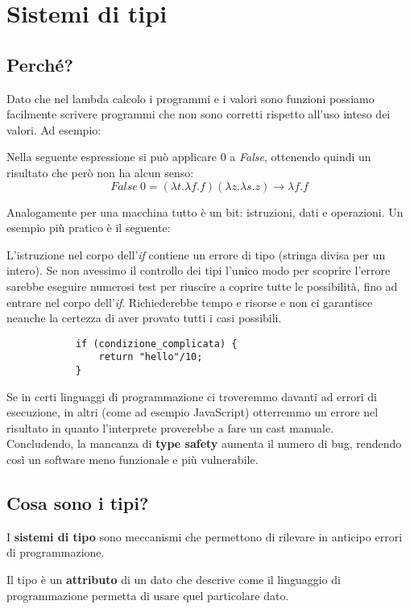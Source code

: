 \newpage
\section{Sistemi di tipi}
\subsection{Perché?}
Dato che nel lambda calcolo i programmi e i valori sono funzioni
possiamo facilmente scrivere programmi che non sono corretti rispetto
all’uso inteso dei valori. Ad esempio:
\begin{example}
	Nella seguente espressione si può applicare $0$ a \textit{False}, ottenendo quindi un risultato che però non ha alcun senso:
	\begin{equation}
		False \: 0 = (\lambda t.\lambda f.f)(\lambda z.\lambda s.z) \rightarrow \lambda f.f
	\end{equation} 
\end{example}
\noindent Analogamente per una macchina tutto è un bit: istruzioni, dati e operazioni. 
Un esempio più pratico è il seguente:
\begin{example}
	L'istruzione nel corpo dell'\textit{if} contiene un errore di tipo (stringa divisa per un intero). Se non avessimo il controllo dei tipi l'unico modo per scoprire l'errore sarebbe eseguire numerosi test per riuscire a coprire tutte le possibilità, fino ad entrare nel corpo dell'\textit{if}. Richiederebbe tempo e risorse e non ci garantisce neanche la certezza di aver provato tutti i casi possibili.
	
	\begin{lstlisting}
			if (condizione_complicata) {
				return "hello"/10;
			}
	\end{lstlisting}
\end{example}
Se in certi linguaggi di programmazione ci troveremmo davanti ad errori di esecuzione, in altri (come ad esempio JavaScript) otterremmo un errore nel risultato in quanto l'interprete proverebbe a fare un cast manuale. \\
Concludendo, la mancanza di \textbf{type safety} aumenta il numero di bug, rendendo così un software meno funzionale e più vulnerabile.

\subsection{Cosa sono i tipi?}
I \textbf{sistemi di tipo} sono meccanismi che permettono di rilevare in anticipo errori di programmazione. 
\begin{definition}[Tipo]
	Il tipo è un \textbf{attributo} di un dato che descrive come il linguaggio di programmazione permetta di usare quel particolare dato.
\end{definition}


